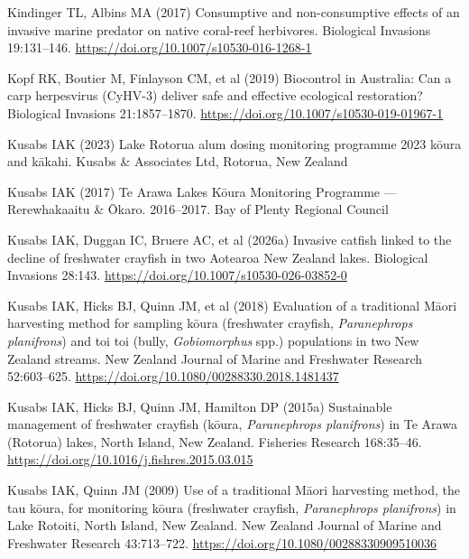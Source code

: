 \documentclass[
  12pt,
  a4paper,
  oneside]{scrbook}
\newlength{\cslhangindent}
\newenvironment{CSLReferences}[2] %
 {\begin{list}{}{%
  \setlength{\itemindent}{0pt}
  \setlength{\leftmargin}{0pt}
  \setlength{\parsep}{0pt}
  \ifodd #1
   \setlength{\leftmargin}{\cslhangindent}
   \setlength{\itemindent}{-1\cslhangindent}
  \fi
  \setlength{\itemsep}{#2\baselineskip}}}
 {\end{list}}
\renewenvironment{CSLReferences}[2]
   {\begin{list}{}{%
    \setlength{\itemindent}{0pt}
    \setlength{\leftmargin}{0pt}
    \setlength{\parsep}{0pt}
    \ifodd #1
     \setlength{\leftmargin}{\cslhangindent}
     \setlength{\itemindent}{-1\cslhangindent}
    \fi
    \setlength{\itemsep}{0.3\baselineskip}}}
   {\end{list}}%
\begin{document}
\begin{CSLReferences}{1}{1}
Kindinger TL, Albins MA (2017) Consumptive and non-consumptive effects
of an invasive marine predator on native coral-reef herbivores.
Biological Invasions 19:131--146.
\url{https://doi.org/10.1007/s10530-016-1268-1}

Kopf RK, Boutier M, Finlayson CM, et al (2019) Biocontrol in
{Australia}: {Can} a carp herpesvirus ({CyHV-3}) deliver safe and
effective ecological restoration? Biological Invasions 21:1857--1870.
\url{https://doi.org/10.1007/s10530-019-01967-1}

Kusabs IAK (2023) {Lake Rotorua} alum dosing monitoring programme 2023
kōura and kākahi. Kusabs \& Associates Ltd, Rotorua, New Zealand

Kusabs IAK (2017) {Te Arawa Lakes Kōura Monitoring Programme ---
Rerewhakaaitu \& Ōkaro. 2016--2017}. Bay of Plenty Regional Council

Kusabs IAK, Duggan IC, Bruere AC, et al (2026a) Invasive catfish linked
to the decline of freshwater crayfish in two {Aotearoa New Zealand}
lakes. Biological Invasions 28:143.
\url{https://doi.org/10.1007/s10530-026-03852-0}

Kusabs IAK, Hicks BJ, Quinn JM, et al (2018) Evaluation of a traditional
{Māori} harvesting method for sampling kōura (freshwater crayfish,
{\emph{Paranephrops planifrons}}) and toi toi (bully,
{\emph{Gobiomorphus}} spp.) populations in two {New Zealand} streams.
New Zealand Journal of Marine and Freshwater Research 52:603--625.
\url{https://doi.org/10.1080/00288330.2018.1481437}

Kusabs IAK, Hicks BJ, Quinn JM, Hamilton DP (2015a) Sustainable
management of freshwater crayfish (kōura, {\emph{Paranephrops
planifrons}}) in {Te Arawa} ({Rotorua}) lakes, {North Island, New
Zealand}. Fisheries Research 168:35--46.
\url{https://doi.org/10.1016/j.fishres.2015.03.015}

Kusabs IAK, Quinn JM (2009) Use of a traditional {Māori} harvesting
method, the tau kōura, for monitoring kōura (freshwater crayfish,
{\emph{Paranephrops planifrons}}) in {Lake Rotoiti, North Island, New
Zealand}. New Zealand Journal of Marine and Freshwater Research
43:713--722. \url{https://doi.org/10.1080/00288330909510036}


\end{CSLReferences}
\end{document}
